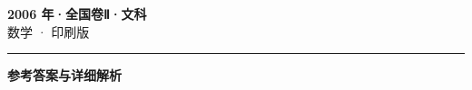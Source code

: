 \documentclass[zihao=5, a4paper]{ctexart}
\begin{document}
\begin{center}
  {\Large\bfseries 2006 年·全国卷Ⅱ·文科}\\[4pt]
  {\large 数学 · 印刷版}
\end{center}
\medskip
{}

\par\bigskip\hrule\bigskip
{}
\begin{center}{\large\bfseries 参考答案与详细解析}\end{center}
\smallskip

\end{document}
